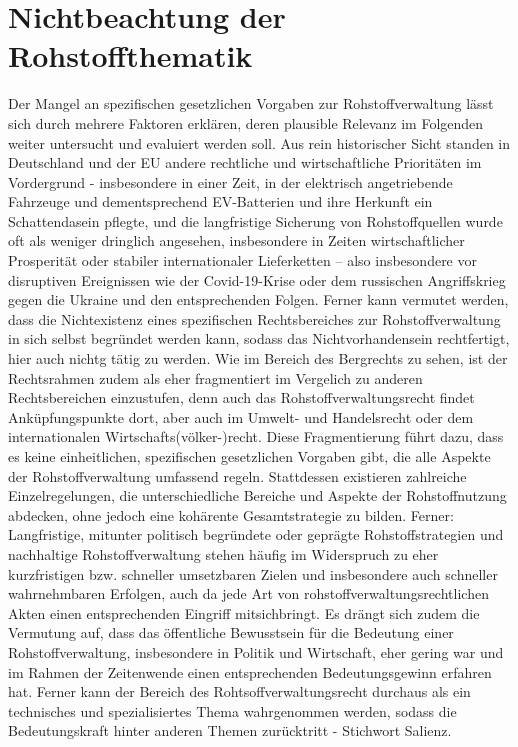 \documentclass[12pt,a4paper,oneside]{book} %
\begin{document}
	\section{Nichtbeachtung der Rohstoffthematik}
	Der Mangel an spezifischen gesetzlichen Vorgaben zur Rohstoffverwaltung lässt sich durch mehrere Faktoren erklären, deren plausible Relevanz im Folgenden weiter untersucht und evaluiert werden soll. Aus rein historischer Sicht standen in Deutschland und der EU andere rechtliche und wirtschaftliche Prioritäten im Vordergrund - insbesondere in einer Zeit, in der elektrisch angetriebende Fahrzeuge und dementsprechend EV-Batterien und ihre Herkunft ein Schattendasein pflegte, und die langfristige Sicherung von Rohstoffquellen wurde oft als weniger dringlich angesehen, insbesondere in Zeiten wirtschaftlicher Prosperität oder stabiler internationaler Lieferketten – also insbesondere vor disruptiven Ereignissen wie der Covid-19-Krise oder dem russischen Angriffskrieg gegen die Ukraine und den entsprechenden Folgen.
	Ferner kann vermutet werden, dass die Nichtexistenz eines spezifischen Rechtsbereiches zur Rohstoffverwaltung in sich selbst begründet werden kann, sodass das Nichtvorhandensein rechtfertigt, hier auch nichtg tätig zu werden. Wie im Bereich des Bergrechts zu sehen, ist der Rechtsrahmen zudem als eher fragmentiert im Vergelich zu anderen Rechtsbereichen einzustufen, denn auch das Rohstoffverwaltungsrecht findet Anküpfungspunkte dort, aber auch im Umwelt- und Handelsrecht oder dem internationalen Wirtschafts(völker-)recht. Diese Fragmentierung führt dazu, dass es keine einheitlichen, spezifischen gesetzlichen Vorgaben gibt, die alle Aspekte der Rohstoffverwaltung umfassend regeln. Stattdessen existieren zahlreiche Einzelregelungen, die unterschiedliche Bereiche und Aspekte der Rohstoffnutzung abdecken, ohne jedoch eine kohärente Gesamtstrategie zu bilden.
	Ferner: Langfristige, mitunter politisch begründete oder geprägte Rohstoffstrategien und nachhaltige Rohstoffverwaltung stehen häufig im Widerspruch zu eher kurzfristigen bzw. schneller umsetzbaren Zielen und insbesondere auch schneller wahrnehmbaren Erfolgen, auch da jede Art von rohstoffverwaltungsrechtlichen Akten einen entsprechenden Eingriff mitsichbringt. 
	Es drängt sich zudem die Vermutung auf, dass das öffentliche Bewusstsein für die Bedeutung einer Rohstoffverwaltung, insbesondere in Politik und Wirtschaft, eher gering war und im Rahmen der Zeitenwende einen entsprechenden Bedeutungsgewinn erfahren hat. Ferner kann der Bereich des Rohtsoffverwaltungsrecht durchaus als ein technisches und spezialisiertes Thema wahrgenommen werden, sodass die Bedeutungskraft hinter anderen Themen zurücktritt - Stichwort Salienz.
	
\end{document}
